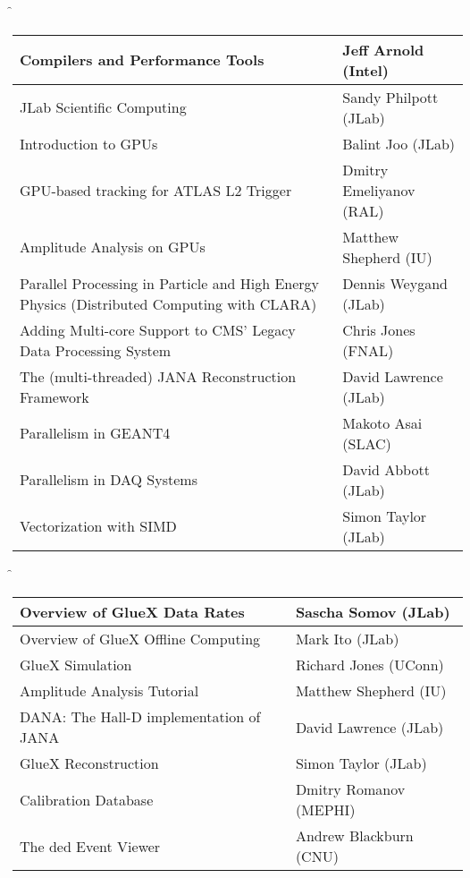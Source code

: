\f{
\small
\begin{tabular}{| p{2.8 in} | l |}
\hline
   Compilers and Performance Tools & Jeff Arnold (Intel) \\
\hline
   JLab Scientific Computing & Sandy Philpott (JLab) \\
\hline
   Introduction to GPUs & Balint Joo (JLab) \\
\hline
   GPU-based tracking for ATLAS L2 Trigger & Dmitry Emeliyanov (RAL) \\
\hline
   Amplitude Analysis on GPUs & Matthew Shepherd (IU) \\
\hline
   Parallel Processing in Particle and High Energy Physics (Distributed Computing with CLARA) & Dennis Weygand (JLab) \\
\hline
   Adding Multi-core Support to CMS' Legacy Data Processing System & Chris Jones (FNAL) \\
\hline
   The (multi-threaded) JANA Reconstruction Framework & David Lawrence (JLab) \\
\hline
   Parallelism in GEANT4 & Makoto Asai (SLAC) \\
\hline
   Parallelism in DAQ Systems & David Abbott (JLab) \\
\hline
   Vectorization with SIMD & Simon Taylor (JLab) \\
\hline
\end{tabular}
}

\f{
\small
\begin{tabular}{| p{2.8 in} | l |}
\hline
   Overview of GlueX Data Rates & Sascha Somov (JLab) \\
\hline
   Overview of GlueX Offline Computing & Mark Ito (JLab) \\
\hline
   GlueX Simulation & Richard Jones (UConn) \\
\hline
   Amplitude Analysis Tutorial & Matthew Shepherd (IU) \\
\hline
   DANA: The Hall-D implementation of JANA & David Lawrence (JLab) \\
\hline
   GlueX Reconstruction & Simon Taylor (JLab) \\
\hline
   Calibration Database & Dmitry Romanov (MEPHI) \\
\hline
   The ded Event Viewer & Andrew Blackburn (CNU) \\
\hline
\end{tabular}
}
